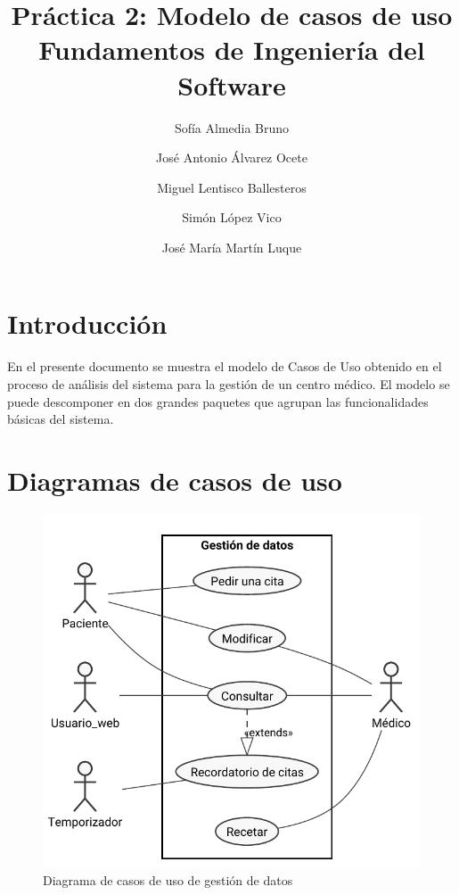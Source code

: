 \documentclass[11pt,a4paper]{article}
\title{Práctica 2: Modelo de casos de uso \large\\ Fundamentos de Ingeniería del Software}
\author{Sofía Almedia Bruno \and José Antonio Álvarez Ocete \and Miguel Lentisco Ballesteros \and Simón López Vico \and José María Martín Luque}
\begin{document}
\maketitle

\section{Introducción}

En el presente documento se muestra el modelo de Casos de Uso obtenido en el proceso de análisis del sistema para la gestión de un centro médico. El modelo se puede descomponer en dos grandes paquetes que agrupan las funcionalidades básicas del sistema.

\section{Diagramas de casos de uso} %

\begin{figure}[H]
	\caption{Diagrama de casos de uso de gestión de datos}
	\centering
	\includegraphics{diagramas/gestion_datos}
\end{figure}
\end{document}
